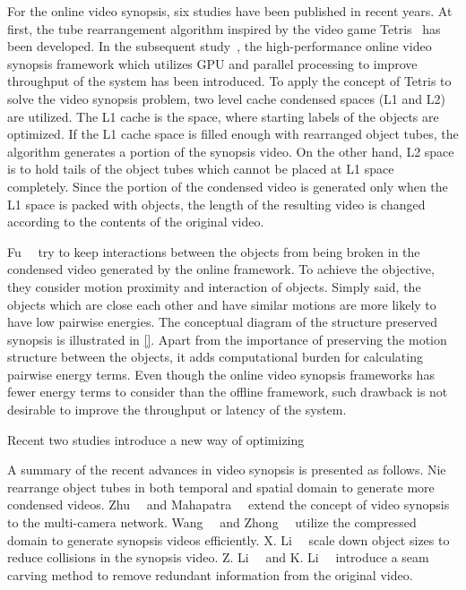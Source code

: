 \documentclass[11pt]{hyu_thesis}
\begin{document}
For the online video synopsis, six studies have been published in recent years. At first, the tube rearrangement algorithm inspired by the video game Tetris~\cite{Feng2012} has been developed. In the subsequent study~\cite{Zhu2015}, the high-performance online video synopsis framework which utilizes GPU and parallel processing to improve throughput of the system has been introduced. To apply the concept of Tetris to solve the video synopsis problem, two level cache condensed spaces (L1 and L2) are utilized. The L1 cache is the space, where starting labels of the objects are optimized. If the L1 cache space is filled enough with rearranged object tubes, the algorithm generates a portion of the synopsis video. On the other hand, L2 space is to hold tails of the object tubes which cannot be placed at L1 space completely. Since the portion of the condensed video is generated only when the L1 space is packed with objects, the length of the resulting video is changed according to the contents of the original video.

Fu~\etal~\cite{Fu2014} try to keep interactions between the objects from being broken in the condensed video generated by the online framework. To achieve the objective, they consider motion proximity and interaction of objects. Simply said, the objects which are close each other and have similar motions are more likely to have low pairwise energies. The conceptual diagram of the structure preserved synopsis is illustrated in \ref{}. Apart from the importance of preserving the motion structure between the objects, it adds computational burden for calculating pairwise energy terms. Even though the online video synopsis frameworks has fewer energy terms to consider than the offline framework, such drawback is not desirable to improve the throughput or latency of the system.

Recent two studies introduce a new way of optimizing 

A summary of the recent advances in video synopsis is presented as follows. Nie~\etal~\cite{Nie2014} rearrange object tubes in both temporal and spatial domain to generate more condensed videos. Zhu~\etal~\cite{Zhu2014} and Mahapatra~\etal~\cite{Mahapatra2016} extend the concept of video synopsis to the multi-camera network. Wang~\etal~\cite{Wang2013} and Zhong~\etal~\cite{Zhong2014} utilize the compressed domain to generate synopsis videos efficiently. X. Li~\etal~\cite{Li2016a} scale down object sizes to reduce collisions in the synopsis video. Z. Li~\etal~\cite{Li2009} and K. Li~\etal~\cite{Li2016} introduce a seam carving method to remove redundant information from the original video.
\end{document}
